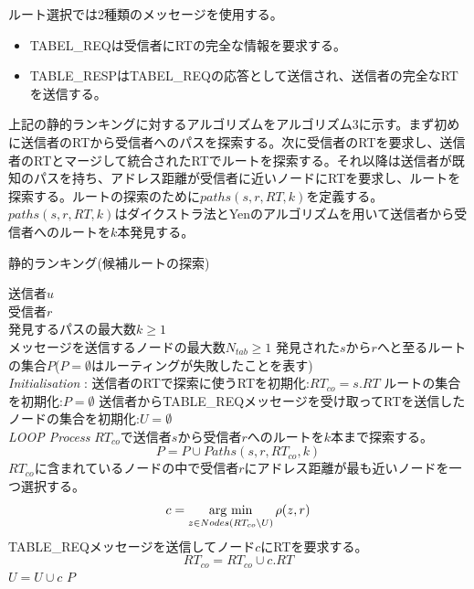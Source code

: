 \documentclass[12pt]{jarticle}
\newcommand{\argmin}{\mathop{\rm arg~min}\limits}
\begin{document}
ルート選択では2種類のメッセージを使用する。
\begin{itemize}
\item TABEL\_REQは受信者にRTの完全な情報を要求する。
\item TABLE\_RESPはTABEL\_REQの応答として送信され、送信者の完全なRTを送信する。
\end{itemize}

上記の静的ランキングに対するアルゴリズムをアルゴリズム3に示す。まず初めに送信者のRTから受信者へのパスを探索する。次に受信者のRTを要求し、送信者のRTとマージして統合されたRTでルートを探索する。それ以降は送信者が既知のパスを持ち、アドレス距離が受信者に近いノードにRTを要求し、ルートを探索する。ルートの探索のために$paths(s, r, RT, k)$を定義する。$paths(s, r, RT, k)$はダイクストラ法とYenのアルゴリズム\cite{Yen}を用いて送信者から受信者へのルートを$k$本発見する。

\begin{algorithm}
 \caption{静的ランキング(候補ルートの探索)}
 \begin{algorithmic}[1]
 \renewcommand{\algorithmicrequire}{\textbf{Input:}}
 \renewcommand{\algorithmicensure}{\textbf{Output:}}
 \REQUIRE 送信者$u$ \\
 受信者$r$ \\
 発見するパスの最大数$k \geq 1$ \\
 メッセージを送信するノードの最大数$N_{tab} \geq 1$ 
 \ENSURE  発見された$s$から$r$へと至るルートの集合$P$($P = \emptyset$はルーティングが失敗したことを表す)
 \\ \textit{Initialisation} :
  \STATE 送信者のRTで探索に使うRTを初期化:$RT_{co} = s.RT$
  \STATE ルートの集合を初期化:$P = \emptyset$
  \STATE 送信者からTABLE\_REQメッセージを受け取ってRTを送信したノードの集合を初期化:$U = \emptyset$
 \\ \textit{LOOP Process}
  \STATE $RT_{co}$で送信者$s$から受信者$r$へのルートを$k$本まで探索する。
  \begin{equation*}
P = P \cup Paths(s, r, RT_{co}, k)
\end{equation*}
  \STATE $RT_{co}$に含まれているノードの中で受信者$r$にアドレス距離が最も近いノードを一つ選択する。
  \begin{equation*}
  c = \argmin_{z \in Nodes(RT_{co} \backslash U)} \rho(z, r)
  \end{equation*}
  \STATE TABLE\_REQメッセージを送信してノード$c$にRTを要求する。
  \begin{equation*}
  RT_{co} = RT_{co} \cup c.RT
  \end{equation*}
  \STATE $U = U \cup {c}$
  \ENDIF 
  \ENDWHILE
  \RETURN $P$ 
 \end{algorithmic} 
 \end{algorithm}
 
\end{document}
